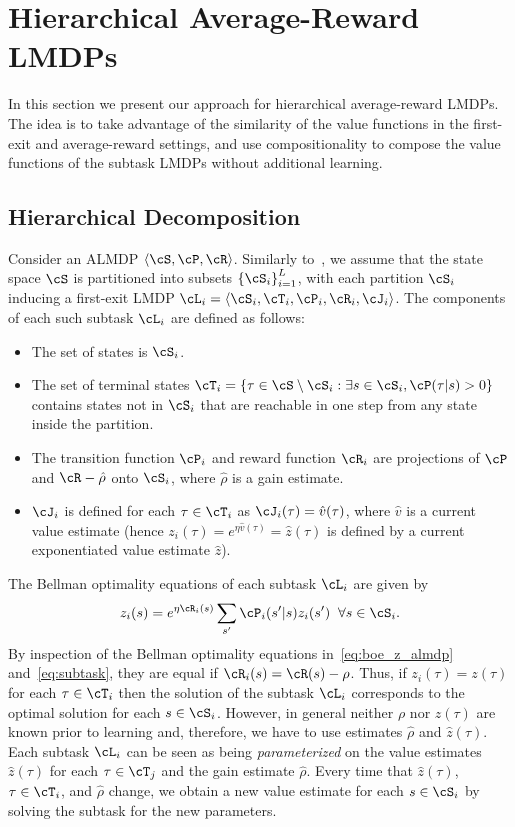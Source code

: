 \section{Hierarchical Average-Reward LMDPs}

In this section we present our approach for hierarchical average-reward LMDPs. The idea is to take advantage of the similarity of the value functions in the first-exit and average-reward settings, and use compositionality to compose the value functions of the subtask LMDPs without additional learning.

\subsection{Hierarchical Decomposition}
Consider an ALMDP $\langle\cS,\cP,\cR\rangle$. 
Similarly to~\citet{Infante2022}, we assume that the state space $\cS$ is partitioned into subsets $\left\{\cS_i\right\}^L_{i=1}$, with each partition $\cS_i$ inducing
a first-exit LMDP $\cL_i = \langle\cS_i, \cT_i, \cP_i, \cR_i,\cJ_i\rangle$.
The components of each such subtask $\cL_i$ are defined as follows:
\begin{itemize}
  \item The set of states is $\cS_i$.
  \item The set of terminal states $\cT_i=\{\tau\in\cS\setminus\cS_i: \exists s\in\cS_i, \cP(\tau|s)>0\}$ contains states not in $\cS_i$ that are reachable in one step from any state inside the partition.
  \item The transition function $\cP_i$ and reward function $\cR_i$ are projections of $\cP$ and $\cR-\hat\rho$ onto $\cS_i$, where $\hat\rho$ is a gain estimate.
  \item $\cJ_i$ is defined for each $\tau\in\cT_i$ as $\cJ_i(\tau)=\hat v(\tau)$, where $\hat v$ is a current value estimate (hence $z_i(\tau)=e^{\eta\hat v(\tau)} = \hat z(\tau)$ is defined by a current exponentiated value estimate $\hat z$).
\end{itemize}
The Bellman optimality equations of each subtask $\cL_i$ are given by
\begin{equation}\label{eq:subtask}
  z_i(s) = e^{\eta \cR_i(s)} \sum_{s'} \cP_i(s'|s) z_i(s') \;\; \forall s\in\cS_i.
\end{equation}
By inspection of the Bellman optimality equations in~\eqref{eq:boe_z_almdp} and~\eqref{eq:subtask}, they are equal if $\cR_i(s)=\cR(s)-\rho$. Thus, if $z_i(\tau)=z(\tau)$ for each $\tau\in\cT_i$ then the solution of the subtask $\cL_i$ corresponds to the optimal solution for each $s\in\cS_i$. However, in general neither $\rho$ nor $z(\tau)$ are known prior to learning and, therefore, we have to use estimates $\hat\rho$ and $\hat z(\tau)$. Each subtask $\cL_i$ can be seen as being {\it parameterized\/} on the value estimates $\hat z(\tau)$ for each $\tau\in\cT_j$ and the gain estimate $\hat\rho$. Every time that $\hat z(\tau)$, $\tau\in\cT_i$, and $\hat\rho$ change, we obtain a new value estimate for each $s\in\cS_i$ by solving the subtask for the new parameters.

